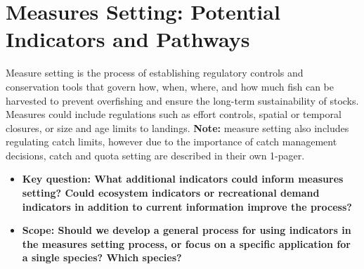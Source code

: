 \documentclass[
]{article}
\author{}
\date{\vspace{-2.5em}}
\providecommand{\tightlist}{%
  \setlength{\itemsep}{0pt}\setlength{\parskip}{0pt}}
\begin{document}
\vspace{-1cm}

\section{Measures Setting: Potential Indicators and
Pathways}\label{measures-setting-potential-indicators-and-pathways}

\begin{noteblock}
Measure setting is the process of establishing regulatory controls and
conservation tools that govern how, when, where, and how much fish can
be harvested to prevent overfishing and ensure the long-term
sustainability of stocks. Measures could include regulations such as
effort controls, spatial or temporal closures, or size and age limits to
landings. \textbf{Note: }measure setting also includes regulating catch
limits, however due to the importance of catch management decisions,
catch and quota setting are described in their own 1-pager.

\end{noteblock}

\begin{itemize}
\tightlist
\item
  \textbf{Key question: What additional indicators could inform measures
  setting? Could ecosystem indicators or recreational demand indicators
  in addition to current information improve the process?}
\item
  \textbf{Scope: Should we develop a general process for using
  indicators in the measures setting process, or focus on a specific
  application for a single species? Which species?}
\end{itemize}
\end{document}
